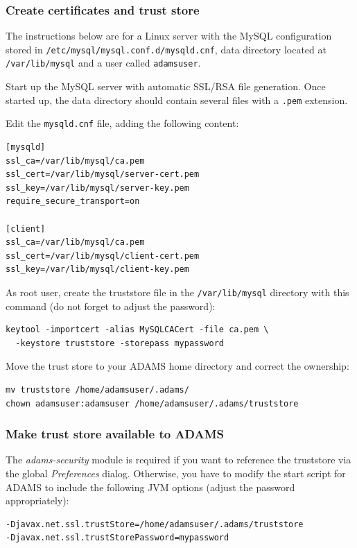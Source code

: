 \subsubsection{Create certificates and trust store}
\noindent The instructions below are for a Linux server with the MySQL configuration stored in
\texttt{/etc/mysql/mysql.conf.d/mysqld.cnf}, data directory located at \texttt{/var/lib/mysql}
and a user called \texttt{adamsuser}.
\begin{tight_itemize}
    \item Start up the MySQL server with automatic SSL/RSA file generation. Once started up,
    the data directory should contain several files with a \texttt{.pem} extension.
    \item Edit the \texttt{mysqld.cnf} file, adding the following content:
    \begin{verbatim}
[mysqld]
ssl_ca=/var/lib/mysql/ca.pem
ssl_cert=/var/lib/mysql/server-cert.pem
ssl_key=/var/lib/mysql/server-key.pem
require_secure_transport=on

[client]
ssl_ca=/var/lib/mysql/ca.pem
ssl_cert=/var/lib/mysql/client-cert.pem
ssl_key=/var/lib/mysql/client-key.pem
    \end{verbatim}
    \item As root user, create the truststore file in the \texttt{/var/lib/mysql} directory with this command
    (do not forget to adjust the password):
    \begin{verbatim}
keytool -importcert -alias MySQLCACert -file ca.pem \
  -keystore truststore -storepass mypassword
    \end{verbatim}
    \item Move the trust store to your ADAMS home directory and correct the ownership:
    \begin{verbatim}
mv truststore /home/adamsuser/.adams/
chown adamsuser:adamsuser /home/adamsuser/.adams/truststore
    \end{verbatim}
\end{tight_itemize}

\subsubsection{Make trust store available to ADAMS}
The \textit{adams-security} module is required if you want to reference the truststore
via the global \textit{Preferences} dialog. Otherwise, you have to modify the start script for
ADAMS to include the following JVM options (adjust the password appropriately):
\begin{verbatim}
-Djavax.net.ssl.trustStore=/home/adamsuser/.adams/truststore
-Djavax.net.ssl.trustStorePassword=mypassword
\end{verbatim}

